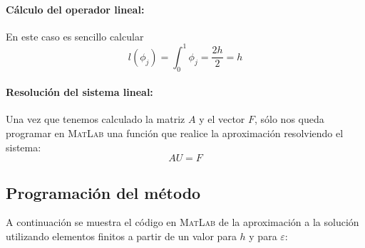 \documentclass[spanish]{mathnotes}
\begin{document}
	\paragraph{Cálculo del operador lineal:}
	En este caso es sencillo calcular
	$$l(\phi_j) = \int_0^1 \phi_j = \frac{2h}{2} = h$$
	\paragraph{Resolución del sistema lineal:}
	Una vez que tenemos calculado la matriz $A$ y el vector $F$, sólo nos queda programar en \textsc{MatLab} una función que realice la aproximación resolviendo el sistema:
	$$AU = F$$
	\subsection{Programación del método}
	A continuación se muestra el código en \textsc{MatLab} de la aproximación a la solución utilizando elementos finitos a partir de un valor para $h$ y para $\varepsilon$:
	\lstset{style=matlabStyle}
	
\end{document}
